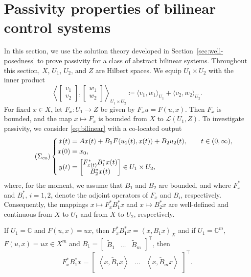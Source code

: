 \documentclass{cocv}
\newcommand{\inprod}[2]{\left\langle#1,#2\right\rangle}
\newcommand{\CC}{\mathbb C}
\theoremstyle{definition}
\begin{document}
\section{Passivity properties of bilinear control systems}
\label{sec:passive}
In this section, we use the solution theory developed in
Section~\ref{sec:well-posedness} to prove passivity for a class of abstract
bilinear systems. Throughout this section, $X$, $U_1$, $U_2$, and $Z$ are
Hilbert spaces. We equip $U_1\times U_2$ with the inner product
\[
\left\langle
\begin{bmatrix}v_1\\v_2\end{bmatrix},
\begin{bmatrix}w_1\\w_2\end{bmatrix}
\right\rangle_{U_1\times U_2}
\coloneqq
\langle v_1,w_1\rangle_{U_1}
+
\langle v_2,w_2\rangle_{U_2}.
\]
For fixed $x\in X$, let $F_x\colon U_1\to Z$ be given by
$F_xu=F(u,x)$. Then $F_x$ is bounded, and the map
$x\mapsto F_x$ is bounded from $X$ to $\mathcal L(U_1,Z)$. To investigate passivity, we consider \eqref{eq:bilinear} with a co-located output
\begin{equation}\label{eq:co-located_mild_bilinear}\tag{$\Sigma_{\text{co}}$}
    \left\{\begin{aligned}
        \dot x(t) &= Ax(t) + B_1F(u_1(t),x(t)) + B_2u_2(t),\qquad  t\in (0, \infty),\\
        x(0) &= x_0,\\
        y(t) &= \begin{bmatrix}F_{x(t)}^* B_1^*x(t) \\ B_2^*x(t)\end{bmatrix} \in U_1 \times U_2,
    \end{aligned}\right.
\end{equation}
where, for the moment, we assume that $B_1$ and $B_2$ are bounded, and where
$F_x^*$ and $B_i^*$, $i=1,2$, denote the adjoint operators of $F_x$ and $B_i$, respectively. Consequently, the mappings $x \mapsto F_x^*B_1^*x$ and $x \mapsto B_2^*x$ are well-defined and continuous from $X$ to $U_1$ and from $X$ to $U_2$, respectively.

If $U_1= \CC$ and $F(u,x)=ux$, then $F_x^*B_1^*x = \inprod{x}{B_1x}_X$ and if $U_1 = \CC^m$, $F(u,x)=ux \in X^m$ and $B_1 = \begin{bmatrix}
    \tilde B_1 & \dots & \tilde B_m
\end{bmatrix}^\top$, then \[
F_x^*B_1^*x = \begin{bmatrix}
    \inprod{x}{\tilde B_1x} & \dots & \inprod{x}{\tilde B_mx}
\end{bmatrix}^\top.
\]
\end{document}
